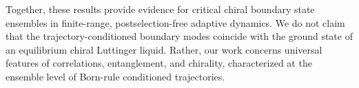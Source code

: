 Together, these results provide evidence for critical chiral boundary state ensembles in finite-range, postselection-free adaptive dynamics. We do not claim that the trajectory-conditioned boundary modes coincide with the ground state of an equilibrium chiral Luttinger liquid. Rather, our work concerns universal features of correlations, entanglement, and chirality, characterized at the ensemble level of Born-rule conditioned trajectories.